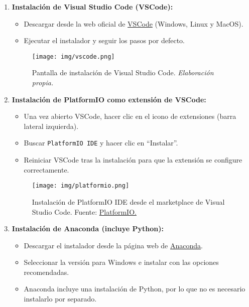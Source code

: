\begin{enumerate}
  \item \textbf{Instalación de Visual Studio Code (VSCode):}
  \begin{itemize}
    \item Descargar desde la web oficial de \href{https://code.visualstudio.com/}{VSCode} (Windows, Linux y MacOS).
    \item Ejecutar el instalador y seguir los pasos por defecto.
  \end{itemize}

  \begin{figure}[H]
  \centering
  \texttt{[image: img/vscode.png]}
  \caption{Pantalla de instalación de Visual Studio Code. \textit{Elaboración propia.}}
  \label{fig:vscode_instalacion}
\end{figure}

  \item \textbf{Instalación de PlatformIO como extensión de VSCode:}
  \begin{itemize}
    \item Una vez abierto VSCode, hacer clic en el icono de extensiones (barra lateral izquierda).
    \item Buscar \texttt{PlatformIO IDE} y hacer clic en “Instalar”.
    \item Reiniciar VSCode tras la instalación para que la extensión se configure correctamente.
  \end{itemize}

  \begin{figure}[H]
  \centering
  \texttt{[image: img/platformio.png]}
  \caption{Instalación de PlatformIO IDE desde el marketplace de Visual Studio Code. Fuente: \href{https://platformio.org/install/ide}{PlatformIO.}}
  \label{fig:platformio_instalacion}
\end{figure}

  \item \textbf{Instalación de Anaconda (incluye Python):}
  \begin{itemize}
    \item Descargar el instalador desde la página web de \href{https://www.anaconda.com/products/distribution}{Anaconda}.
    \item Seleccionar la versión para Windows e instalar con las opciones recomendadas.
    \item Anaconda incluye una instalación de Python, por lo que no es necesario instalarlo por separado.
  \end{itemize}


\end{enumerate}
